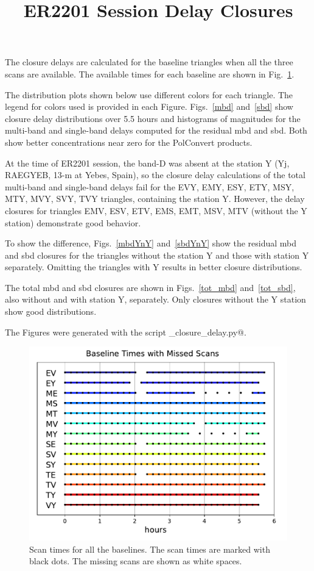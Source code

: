 \documentclass[letterpaper,twoside,12pt]{article}
\title{ER2201 Session Delay Closures}
\begin{document}
\maketitle

The closure delays are calculated for the baseline triangles when all the three scans are available. The available times for each baseline are shown in Fig.~\ref{time_gaps}.

The distribution plots shown below use different colors for each triangle. The legend for colors used is provided in each Figure. Figs.~\ref{mbd} and~\ref{sbd} show closure delay distributions over 5.5 hours and histograms of magnitudes for the multi-band and single-band delays computed for the residual mbd and sbd. Both show better concentrations near zero for the PolConvert products.

At the time of ER2201 session, the band-D was absent at the station Y (Yj, RAEGYEB, 13-m at Yebes, Spain), so the closure delay calculations of the total multi-band and single-band delays fail for the EVY, EMY, ESY, ETY, MSY, MTY, MVY, SVY, TVY triangles, containing the station Y. However, the delay closures for triangles EMV, ESV, ETV, EMS, EMT, MSV, MTV (without the Y station) demonstrate good behavior. 

To show the difference, Figs.~\ref{mbdYnY} and~\ref{sbdYnY} show the residual mbd and sbd closures for the triangles without the station Y and those with station Y separately. Omitting the triangles with Y results in better closure distributions. 

The total mbd and sbd closures are shown in Figs.~\ref{tot_mbd} and~\ref{tot_sbd}, also without and with station Y, separately. Only closures without the Y station show good distributions.  

The Figures were generated with the script \verb@plot_closure_delay.py@.


\begin{figure}[h!]
  \centering
  \includegraphics[width=30pc]{Gaps_in_Time.pdf}
  \caption{\small Scan times for all the baselines. The scan times are marked with black dots. The missing scans are shown as white spaces. }
  \label{time_gaps}
\end{figure}
\end{document}
